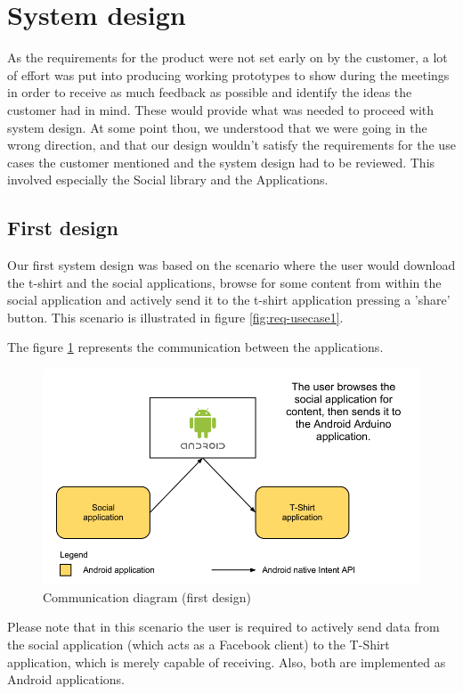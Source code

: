 \newpage
\section{System design}
\label{sec:system_design}
As the requirements for the product were not set early on by the customer, a lot of effort
was put into producing working prototypes to show during the meetings in order to receive
as much feedback as possible and identify the ideas the customer had in mind.
These would provide what was needed to proceed with system design. At some point thou,
we understood that we were going in the wrong direction, and that our design wouldn't
satisfy the requirements for the use cases the customer mentioned and the system design had to be
reviewed. This involved especially the Social library and the Applications.

\subsection{First design}
Our first system design was based on the scenario where the user would download the t-shirt
and the social applications, browse for some content from within the social application
and actively send it to the t-shirt application pressing a 'share' button.
This scenario is illustrated in figure \ref{fig:req-usecase1}.

The figure \ref{fig:design-resp} represents the communication between the applications.

\begin{figure}[h!]
\centering \includegraphics[scale=0.35]{img/design-resp.png}
\caption{Communication diagram (first design)}
\label{fig:design-resp}
\end{figure}

Please note that in this scenario the user is required to actively send data from
the social application (which acts as a Facebook client) to the T-Shirt application,
which is merely capable of receiving. Also, both are implemented as Android applications.

